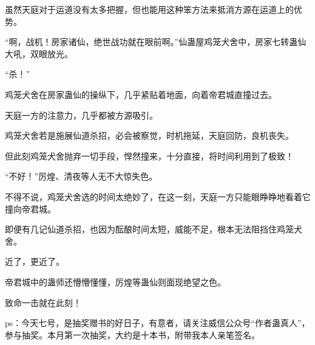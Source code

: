 \begin{this_body}
虽然天庭对于运道没有太多把握，但也能用这种笨方法来抵消方源在运道上的优势。

“啊，战机！房家诸仙，绝世战功就在眼前啊。”仙蛊屋鸡笼犬舍中，房家七转蛊仙大吼，双眼放光。

“杀！”

鸡笼犬舍在房家蛊仙的操纵下，几乎紧贴着地面，向着帝君城直撞过去。

天庭一方的注意力，几乎都被方源吸引。

鸡笼犬舍若是施展仙道杀招，必会被察觉，时机拖延，天庭回防，良机丧失。

但此刻鸡笼犬舍抛弃一切手段，悍然撞来，十分直接，将时间利用到了极致！

“不好！”厉煌、清夜等人无不大惊失色。

不得不说，鸡笼犬舍选的时间太绝妙了，在这一刻，天庭一方只能眼睁睁地看着它撞向帝君城。

即便有几记仙道杀招，也因为酝酿时间太短，威能不足，根本无法阻挡住鸡笼犬舍。

近了，更近了。

帝君城中的蛊师还懵懵懂懂，厉煌等蛊仙则面现绝望之色。

致命一击就在此刻！

ps：今天七号，是抽奖赠书的好日子，有意者，请关注威信公众号“作者蛊真人”，参与抽奖。本月第一次抽奖，大约是十本书，附带我本人亲笔签名。

\end{this_body}

